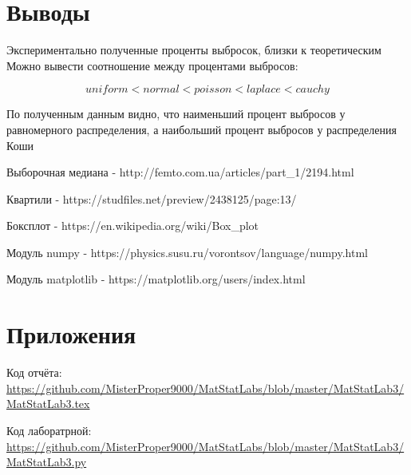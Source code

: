 \documentclass[a4]{article}
\begin{document}
\section{Выводы}
\par Экспериментально полученные проценты выбросок, близки к теоретическим
Можно вывести соотношение между процентами выбросов:

\begin{equation}
uniform<normal<poisson<laplace<cauchy
\end{equation}

\par По полученным данным видно, что наименьший процент выбросов у равномерного распределения, а наибольший процент выбросов у распределения Коши

\begin{thebibliography}{}
    Выборочная медиана  -  http://femto.com.ua/articles/part\_1/2194.html
    
    Квартили -  https://studfiles.net/preview/2438125/page:13/
    
    Боксплот - https://en.wikipedia.org/wiki/Box\_plot
    
    Модуль numpy  -  https://physics.susu.ru/vorontsov/language/numpy.html
    
    Модуль matplotlib - https://matplotlib.org/users/index.html
    
 
\end{thebibliography}

\section{Приложения}


Код отчёта:\; \url{https://github.com/MisterProper9000/MatStatLabs/blob/master/MatStatLab3/MatStatLab3.tex}

Код лаборатрной:\; \url{https://github.com/MisterProper9000/MatStatLabs/blob/master/MatStatLab3/MatStatLab3.py}


\end{document}

